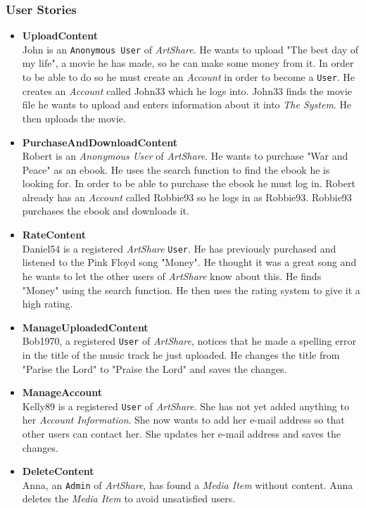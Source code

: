 \subsubsection{User Stories}
\label{sec:User Stories}
\begin{itemize}
\item \textbf{UploadContent} \\
John is an \texttt{Anonymous User} of \textit{ArtShare}. He wants to upload "The best day of my life", a movie he has made, so he can make some money from it. In order to be able to do so he must create an \textit{Account} in order to become a \texttt{User}. He creates an \textit{Account} called John33 which he logs into. John33 finds the movie file he wants to upload and enters information about it into \textit{The System}. He then uploads the movie.
\item \textbf{PurchaseAndDownloadContent} \\
Robert is an \textit{Anonymous User} of \textit{ArtShare}. He wants to purchase "War and Peace" as an ebook. He uses the search function to find the ebook he is looking for. In order to be able to purchase the ebook he must log in. Robert already has an \textit{Account} called Robbie93 so he logs in as Robbie93. Robbie93 purchases the ebook and downloads it.
\item \textbf{RateContent} \\
Daniel54 is a registered \textit{ArtShare} \texttt{User}. He has previously purchased and listened to the Pink Floyd song "Money". He thought it was a great song and he wants to let the other users of \textit{ArtShare} know about this. He finds "Money" using the search function. He then uses the rating system to give it a high rating.
\item \textbf{ManageUploadedContent} \\
Bob1970, a registered \texttt{User} of \textit{ArtShare}, notices that he made a spelling error in the title of the music track he just uploaded. He changes the title from "Parise the Lord" to "Praise the Lord" and saves the changes.
\item \textbf{ManageAccount} \\
Kelly89 is a registered \texttt{User} of \textit{ArtShare}. She has not yet added anything to her \textit{Account Information}. She now wants to add her e-mail address so that other users can contact her. She updates her e-mail address and saves the changes.
\item \textbf{DeleteContent} \\
Anna, an \texttt{Admin} of \textit{ArtShare}, has found a \textit{Media Item} without content. Anna deletes the \textit{Media Item} to avoid unsatisfied users.
\end{itemize}

%